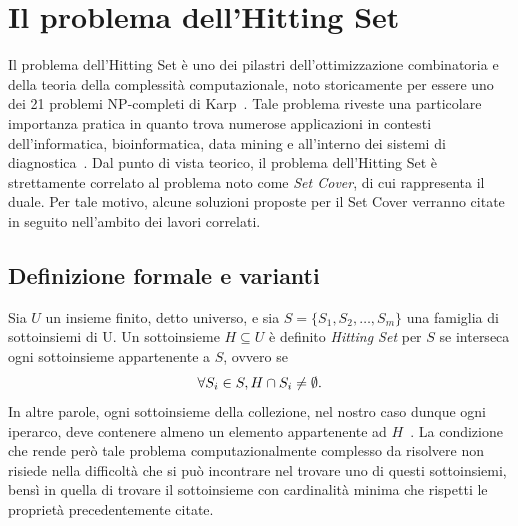 
\section{Il problema dell'Hitting Set}\label{sec:il_problema_dell_hitting_set}

Il problema dell'Hitting Set è uno dei pilastri dell'ottimizzazione combinatoria e della teoria della complessità computazionale, noto storicamente per essere uno dei 21 problemi NP-completi di Karp~\cite{karp1972}.
Tale problema riveste una particolare importanza pratica in quanto trova numerose applicazioni in contesti dell'informatica, bioinformatica, data mining e all'interno dei sistemi di diagnostica~\cite{moreno2013, mcguire2014}.
Dal punto di vista teorico, il problema dell'Hitting Set è strettamente correlato al problema noto come \textit{Set Cover}, di cui rappresenta il duale.
Per tale motivo, alcune soluzioni proposte per il Set Cover verranno citate in seguito nell'ambito dei lavori correlati.

\subsection{Definizione formale e varianti}

Sia $U$ un insieme finito, detto universo, e sia $S = \{S_1,S_2,\dots,S_m\}$ una famiglia di sottoinsiemi di U.
Un sottoinsieme $H \subseteq U$ è definito \textit{Hitting Set} per $S$ se interseca ogni sottoinsieme appartenente a $S$, ovvero se
\[
    \forall S_i \in S,\space H \cap S_i \neq \emptyset.
\]
In altre parole, ogni sottoinsieme della collezione, nel nostro caso dunque ogni iperarco, deve contenere almeno un elemento appartenente ad $H$~\cite{garey1979, bretto2013}.
La condizione che rende però tale problema computazionalmente complesso da risolvere non risiede nella difficoltà che si può incontrare nel trovare uno di questi sottoinsiemi, bensì in quella di trovare il sottoinsieme con cardinalità minima che rispetti le proprietà precedentemente citate.

